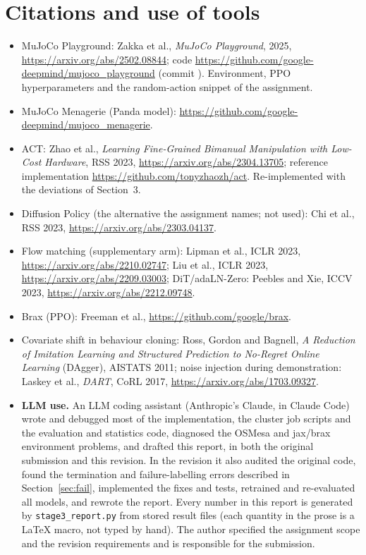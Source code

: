 \documentclass[11pt]{article}
\begin{document}
\section{Citations and use of tools}
\begin{itemize}
\item MuJoCo Playground: Zakka et al., \emph{MuJoCo Playground}, 2025,
\url{https://arxiv.org/abs/2502.08844}; code
\url{https://github.com/google-deepmind/mujoco_playground} (commit
\texttt{\playgroundSha}). Environment, PPO hyperparameters and the random-action
snippet of the assignment.
\item MuJoCo Menagerie (Panda model): \url{https://github.com/google-deepmind/mujoco_menagerie}.
\item ACT: Zhao et al., \emph{Learning Fine-Grained Bimanual Manipulation with
Low-Cost Hardware}, RSS 2023, \url{https://arxiv.org/abs/2304.13705}; reference
implementation \url{https://github.com/tonyzhaozh/act}. Re-implemented with the
deviations of Section~3.
\item Diffusion Policy (the alternative the assignment names; not used): Chi et
al., RSS 2023, \url{https://arxiv.org/abs/2303.04137}.
\item Flow matching (supplementary arm): Lipman et al., ICLR 2023,
\url{https://arxiv.org/abs/2210.02747}; Liu et al., ICLR 2023,
\url{https://arxiv.org/abs/2209.03003}; DiT/adaLN-Zero: Peebles and Xie, ICCV
2023, \url{https://arxiv.org/abs/2212.09748}.
\item Brax (PPO): Freeman et al., \url{https://github.com/google/brax}.
\item Covariate shift in behaviour cloning: Ross, Gordon and Bagnell, \emph{A
Reduction of Imitation Learning and Structured Prediction to No-Regret Online
Learning} (DAgger), AISTATS 2011; noise injection during demonstration: Laskey
et al., \emph{DART}, CoRL 2017, \url{https://arxiv.org/abs/1703.09327}.
\item \textbf{LLM use.} An LLM coding assistant (Anthropic's Claude, in Claude
Code) wrote and debugged most of the implementation, the cluster job scripts
and the evaluation and statistics code, diagnosed the OSMesa and jax/brax
environment problems, and drafted this report, in both the original submission
and this revision. In the revision it also audited the original code, found the
termination and failure-labelling errors described in Section~\ref{sec:fail},
implemented the fixes and tests, retrained and re-evaluated all models, and
rewrote the report. Every number in this report is generated by
\texttt{stage3\_report.py} from stored result files (each quantity in the prose
is a LaTeX macro, not typed by hand). The author specified the assignment
scope and the revision requirements and is responsible for the submission.
\end{itemize}
\end{document}
